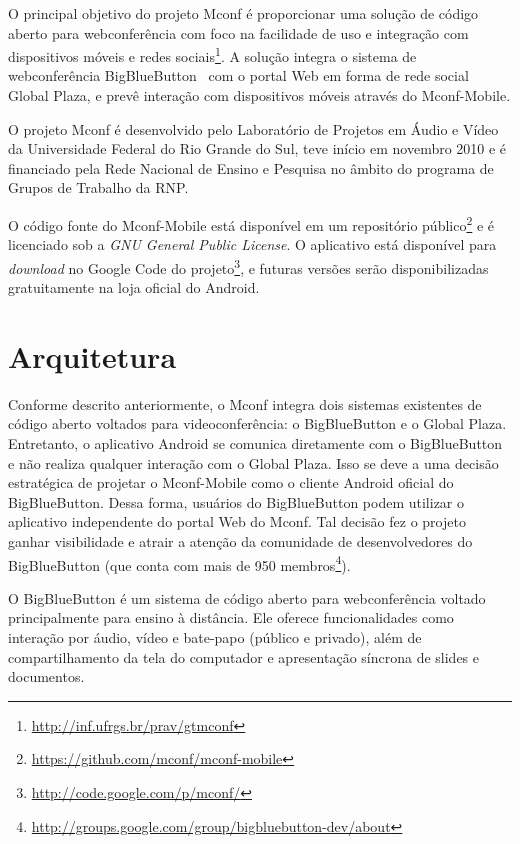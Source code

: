 \documentclass{acm_proc_article-sp}
\begin{document}
O principal objetivo do projeto Mconf é proporcionar uma solução de código aberto para webconferência com foco na facilidade de uso e integração com dispositivos móveis e redes sociais\footnote{\url{http://inf.ufrgs.br/prav/gtmconf}}. A solução integra o sistema de webconferência BigBlueButton~\cite{bigbluebutton} com o portal Web em forma de rede social Global Plaza, e prevê interação com dispositivos móveis através do Mconf-Mobile.

O projeto Mconf é desenvolvido pelo Laboratório de Projetos em Áudio e Vídeo da Universidade Federal do Rio Grande do Sul, teve início em novembro 2010 e é financiado pela Rede Nacional de Ensino e Pesquisa no âmbito do programa de Grupos de Trabalho da RNP.

O código fonte do Mconf-Mobile está disponível em um repositório público\footnote{\url{https://github.com/mconf/mconf-mobile}} e é licenciado sob a \emph{GNU General Public License}. O aplicativo está disponível para \emph{download} no Google Code do projeto\footnote{\url{http://code.google.com/p/mconf/}}, e futuras versões serão disponibilizadas gratuitamente na loja oficial do Android.


\section{Arquitetura}\label{sec:arquitetura}

Conforme descrito anteriormente, o Mconf integra dois sistemas existentes de código aberto voltados para videoconferência: o BigBlueButton e o Global Plaza. Entretanto, o aplicativo Android se comunica diretamente com o BigBlueButton e não realiza qualquer interação com o Global Plaza. Isso se deve a uma decisão estratégica de projetar o Mconf-Mobile como o cliente Android oficial do BigBlueButton. Dessa forma, usuários do BigBlueButton podem utilizar o aplicativo independente do portal Web do Mconf. Tal decisão fez o projeto ganhar visibilidade e atrair a atenção da comunidade de desenvolvedores do BigBlueButton (que conta com mais de 950 membros\footnote{\url{http://groups.google.com/group/bigbluebutton-dev/about}}).

O BigBlueButton é um sistema de código aberto para webconferência voltado principalmente para ensino à distância. Ele oferece funcionalidades como interação por áudio, vídeo e bate-papo (público e privado), além de compartilhamento da tela do computador e apresentação síncrona de slides e documentos.
\end{document}
